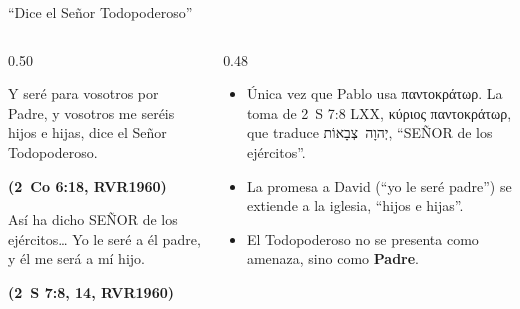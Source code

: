 \documentclass[hyperref={bookmarks=false},aspectratio=169]{beamer}
\newcommand{\heb}[1]{\mbox{\foreignlanguage{hebrew}{#1}}}
\newcommand{\grc}[1]{\foreignlanguage{ancientgreek}{#1}}
\newcommand{\SENOR}{S{\fontsize{0.78em}{1em}\selectfont EÑOR}}
\newcommand{\fuente}[1]{\par\hfill{\upshape\bfseries\footnotesize\textcolor{azul}{#1}}}
\newcommand{\destacar}[1]{\textbf{\textcolor{azul}{#1}}}
\begin{document}
\begin{frame}{``Dice el Señor Todopoderoso''}
\begin{columns}[c,onlytextwidth]
\begin{column}{0.50\textwidth}
\begin{cita}Y seré para vosotros por Padre, y vosotros me seréis hijos e hijas, dice el Señor Todopoderoso.\fuente{(2~Co 6:18, RVR1960)}\end{cita}
\begin{cita}[fontupper=\scriptsize\itshape]Así ha dicho \SENOR{} de los ejércitos\ldots{} Yo le seré a él padre, y él me será a mí hijo.\fuente{(2~S 7:8, 14, RVR1960)}\end{cita}
\end{column}
\begin{column}{0.48\textwidth}\small
\begin{itemize}
\item Única vez que Pablo usa \grc{παντοκράτωρ}. La toma de 2~S 7:8 LXX, \grc{κύριος παντοκράτωρ}, que traduce \heb{יְהוָה צְבָאוֹת}, ``\SENOR{} de los ejércitos''.
\item La promesa a David (``yo le seré padre'') se extiende a la iglesia, ``hijos e hijas''.
\item El Todopoderoso no se presenta como amenaza, sino como \destacar{Padre}.
\end{itemize}
\end{column}
\end{columns}
\end{frame}
\end{document}
